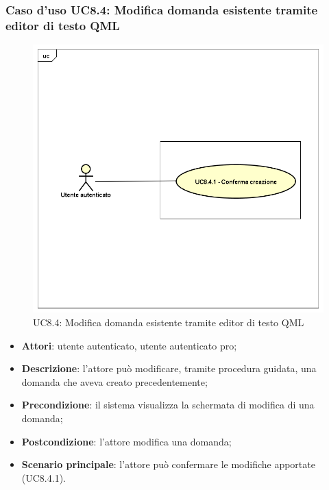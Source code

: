 	\subsubsection{Caso d'uso UC8.4: Modifica domanda esistente tramite editor di testo QML}
	\label{UC8.4}
	\begin{figure}[h]
		\centering
		\includegraphics[scale=0.41,keepaspectratio]{UML/UC8_4.png}
		\caption{UC8.4: Modifica domanda esistente tramite editor di testo QML
			}
	\end{figure}
	\FloatBarrier
	\begin{itemize}
		\item
		\textbf{Attori}: utente autenticato, utente autenticato pro;
		\item		
		\textbf{Descrizione}: l'attore può modificare, tramite procedura guidata, una domanda che aveva creato precedentemente;
		\item
		\textbf{Precondizione}: il sistema visualizza la schermata di modifica di una domanda;
		\item
		\textbf{Postcondizione}: l'attore modifica una domanda;
		\item
		\textbf{Scenario principale}: l'attore può confermare le modifiche apportate (UC8.4.1).
	\end{itemize}
		
